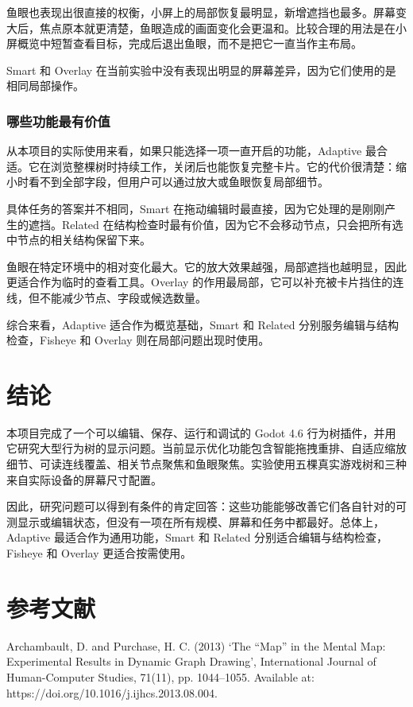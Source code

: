 \documentclass[11pt,a4paper,oneside,extrafontsizes]{memoir}
\begin{document}
鱼眼也表现出很直接的权衡，小屏上的局部恢复最明显，新增遮挡也最多。屏幕变大后，焦点原本就更清楚，鱼眼造成的画面变化会更温和。比较合理的用法是在小屏概览中短暂查看目标，完成后退出鱼眼，而不是把它一直当作主布局。

Smart 和 Overlay 在当前实验中没有表现出明显的屏幕差异，因为它们使用的是相同局部操作。

\subsection{哪些功能最有价值}

从本项目的实际使用来看，如果只能选择一项一直开启的功能，Adaptive 最合适。它在浏览整棵树时持续工作，关闭后也能恢复完整卡片。它的代价很清楚：缩小时看不到全部字段，但用户可以通过放大或鱼眼恢复局部细节。

具体任务的答案并不相同，Smart 在拖动编辑时最直接，因为它处理的是刚刚产生的遮挡。Related 在结构检查时最有价值，因为它不会移动节点，只会把所有选中节点的相关结构保留下来。

鱼眼在特定环境中的相对变化最大。它的放大效果越强，局部遮挡也越明显，因此更适合作为临时的查看工具。Overlay 的作用最局部，它可以补充被卡片挡住的连线，但不能减少节点、字段或候选数量。

综合来看，Adaptive 适合作为概览基础，Smart 和 Related 分别服务编辑与结构检查，Fisheye 和 Overlay 则在局部问题出现时使用。

\chapter{结论}

本项目完成了一个可以编辑、保存、运行和调试的 Godot 4.6 行为树插件，并用它研究大型行为树的显示问题。当前显示优化功能包含智能拖拽重排、自适应缩放细节、可读连线覆盖、相关节点聚焦和鱼眼聚焦。实验使用五棵真实游戏树和三种来自实际设备的屏幕尺寸配置。

因此，研究问题可以得到有条件的肯定回答：这些功能能够改善它们各自针对的可测显示或编辑状态，但没有一项在所有规模、屏幕和任务中都最好。总体上，Adaptive 最适合作为通用功能，Smart 和 Related 分别适合编辑与结构检查，Fisheye 和 Overlay 更适合按需使用。

\chapter*{参考文献}

Archambault, D. and Purchase, H. C. (2013) ‘The “Map” in the Mental Map: Experimental Results in Dynamic Graph Drawing’, International Journal of Human-Computer Studies, 71(11), pp. 1044–1055. Available at: https://doi.org/10.1016/j.ijhcs.2013.08.004.
\end{document}
